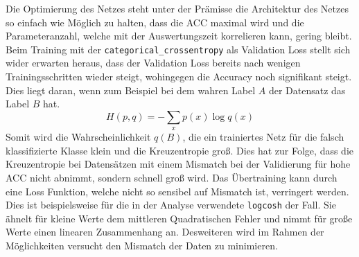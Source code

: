 Die Optimierung des Netzes steht unter der Prämisse die Architektur des Netzes
so einfach wie Möglich zu halten, dass die ACC maximal wird und die Parameteranzahl, welche 
mit der Auswertungszeit korrelieren kann, gering bleibt. 
Beim Training mit der \texttt{categorical\_crossentropy} als Validation Loss stellt sich 
wider erwarten heraus, dass der Validation Loss bereits nach wenigen
Trainingsschritten wieder steigt, wohingegen die Accuracy noch 
signifikant steigt.
Dies liegt daran, wenn zum Beispiel bei dem wahren Label $A$ der 
Datensatz das Label $B$ hat. 
\begin{equation}
		H(p,q) = -\sum_x p(x) \log q(x)
\end{equation}
Somit wird die Wahrscheinlichkeit $q(B)$, die ein trainiertes Netz für die 
falsch klassifizierte Klasse klein und die Kreuzentropie groß.
Dies hat zur Folge, dass die Kreuzentropie bei Datensätzen mit einem Mismatch
bei der Validierung für hohe ACC nicht abnimmt, sondern schnell groß wird.
Das Übertraining kann durch eine Loss Funktion, welche nicht so sensibel auf
Mismatch ist, verringert werden. 
Dies ist beispielsweise für die in der Analyse verwendete \texttt{logcosh} der
Fall. 
Sie ähnelt für kleine Werte dem mittleren Quadratischen Fehler und nimmt für
große Werte einen linearen Zusammenhang an.
Desweiteren wird im Rahmen der Möglichkeiten versucht den Mismatch der Daten 
zu minimieren.

